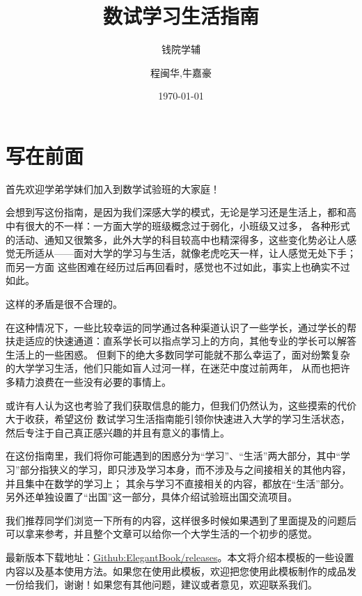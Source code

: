 \documentclass[cn]{elegantbook}
\title{数试学习生活指南}
\subtitle{钱院学辅}
\author{程闽华,牛嘉豪}
\institute{钱院学辅}
\date{\today}
\begin{document}
\maketitle
\tableofcontents
\clearpage
\thispagestyle{empty}

\mainmatter
\hypersetup{pageanchor=true}

\chapter*{写在前面}
首先欢迎学弟学妹们加入到数学试验班的大家庭！\par 
会想到写这份指南，是因为我们深感大学的模式，无论是学习还是生活上，都和高中有很大的不一样：一方面大学的班级概念过于弱化，小班级又过多，
各种形式的活动、通知又很繁多，此外大学的科目较高中也精深得多，这些变化势必让人感觉无所适从——面对大学的学习与生活，就像老虎吃天一样，让人感觉无处下手；而另一方面
这些困难在经历过后再回看时，感觉也不过如此，事实上也确实不过如此。\par
这样的矛盾是很不合理的。\par
在这种情况下，一些比较幸运的同学通过各种渠道认识了一些学长，通过学长的帮扶走适应的快速通道：直系学长可以指点学习上的方向，其他专业的学长可以解答生活上的一些困惑。
但剩下的绝大多数同学可能就不那么幸运了，面对纷繁复杂的大学学习生活，他们只能如盲人过河一样，在迷茫中度过前两年，
从而也把许多精力浪费在一些没有必要的事情上。\par
或许有人认为这也考验了我们获取信息的能力，但我们仍然认为，这些摸索的代价大于收获，希望这份
数试学习生活指南能引领你快速进入大学的学习生活状态，然后专注于自己真正感兴趣的并且有意义的事情上。\par
在这份指南里，我们将你可能遇到的困惑分为“学习”、“生活”两大部分，其中“学习”部分指狭义的学习，即只涉及学习本身，而不涉及与之间接相关的其他内容，并且集中在数学的学习上；
其余与学习不直接相关的内容，都放在“生活”部分。
另外还单独设置了“出国”这一部分，具体介绍试验班出国交流项目。\par
我们推荐同学们浏览一下所有的内容，这样很多时候如果遇到了里面提及的问题后可以拿来参考，并且整个文章可以给你一个大学生活的一个初步的感觉。\par


最新版本下载地址：\href{https://github.com/ElegantLaTeX/ElegantBook/releases}{Github:ElegantBook/releases}。本文将介绍本模板的一些设置内容以及基本使用方法。如果您在使用此模板，欢迎把您使用此模板制作的成品发一份给我们，谢谢！如果您有其他问题，建议或者意见，欢迎联系我们。\par
\end{document}
